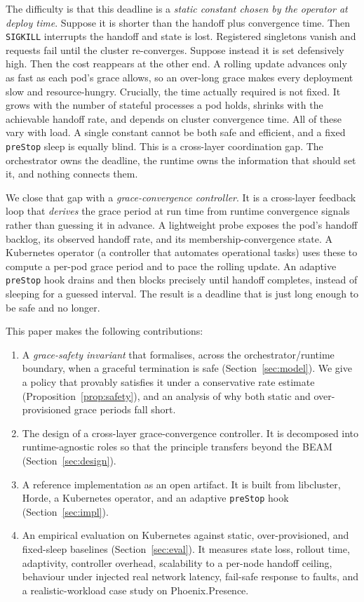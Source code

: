 \documentclass[AMA,Times1COL]{WileyNJDv5}
\begin{document}
The difficulty is that this deadline is a \emph{static constant chosen by the operator at deploy
time}. Suppose it is shorter than the handoff plus convergence time. Then \texttt{SIGKILL} interrupts the
handoff and state is lost. Registered singletons vanish and requests fail until the cluster
re-converges. Suppose instead it is set defensively high. Then the cost reappears at the other end. A
rolling update advances only as fast as each pod's grace allows, so an over-long grace makes every
deployment slow and resource-hungry. Crucially, the time actually required is not fixed. It grows with
the number of stateful processes a pod holds, shrinks with the achievable handoff rate, and depends on
cluster convergence time. All of these vary with load. A single constant cannot be both safe and
efficient, and a fixed \texttt{preStop} sleep is equally blind. This is a cross-layer coordination
gap. The orchestrator owns the deadline, the runtime owns the information that should set it, and
nothing connects them.

We close that gap with a \emph{grace-convergence controller}. It is a cross-layer feedback loop that
\emph{derives} the grace period at run time from runtime convergence signals rather than guessing it
in advance. A lightweight probe exposes the pod's handoff backlog, its observed handoff rate, and its
membership-convergence state. A Kubernetes operator (a controller that automates operational tasks)
uses these to compute a per-pod grace period and to pace the rolling update. An adaptive
\texttt{preStop} hook drains and then blocks precisely until handoff completes, instead of sleeping for
a guessed interval. The result is a deadline that is just long enough to be safe and no longer.

This paper makes the following contributions:
\begin{enumerate}
  \item A \emph{grace-safety invariant} that formalises, across the orchestrator/runtime boundary,
        when a graceful termination is safe (Section~\ref{sec:model}). We give a policy that provably
        satisfies it under a conservative rate estimate (Proposition~\ref{prop:safety}), and an
        analysis of why both static and over-provisioned grace periods fall short.
  \item The design of a cross-layer grace-convergence controller. It is decomposed into
        runtime-agnostic roles so that the principle transfers beyond the BEAM (Section~\ref{sec:design}).
  \item A reference implementation as an open artifact. It is built from libcluster, Horde, a Kubernetes
        operator, and an adaptive \texttt{preStop} hook (Section~\ref{sec:impl}).
  \item An empirical evaluation on Kubernetes against static, over-provisioned, and fixed-sleep
        baselines (Section~\ref{sec:eval}). It measures state loss, rollout time, adaptivity, controller
        overhead, scalability to a per-node handoff ceiling, behaviour under injected real network
        latency, fail-safe response to faults, and a realistic-workload case study on Phoenix.Presence.
\end{enumerate}
\end{document}
